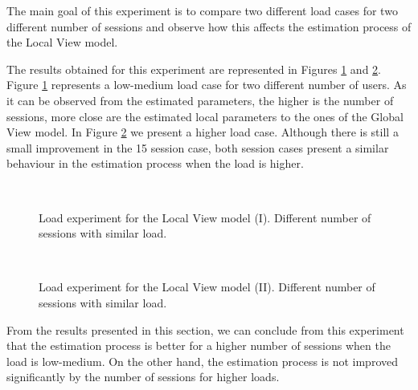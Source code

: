 The main goal of this experiment is to compare two different load cases for two different number of sessions and observe how this affects the estimation process of the Local View model.

The results obtained for this experiment are represented in Figures \ref{fig:lv_load_exp1} and \ref{fig:lv_load_exp2}. Figure \ref{fig:lv_load_exp1} represents a low-medium load case for two different number of users. As it can be observed from the estimated parameters, the higher is the number of sessions, more close are the estimated local parameters to the ones of the Global View model. In Figure \ref{fig:lv_load_exp2} we present a higher load case. Although there is still a small improvement in the 15 session case, both session cases present a similar behaviour in the estimation process when the load is higher.

\begin{figure}[h!]
	\centering
	\\
	\caption{Load experiment for the Local View model (I). Different number of sessions with similar load.}
	\label{fig:lv_load_exp1}
\end{figure}

\begin{figure}[h!]
	\centering
	\\
	\caption{Load experiment for the Local View model (II). Different number of sessions with similar load.}
	\label{fig:lv_load_exp2}
\end{figure}

From the results presented in this section, we can conclude from this experiment that the estimation process is better for a higher number of sessions when the load is low-medium. On the other hand, the estimation process is not improved significantly by the number of sessions for higher loads.